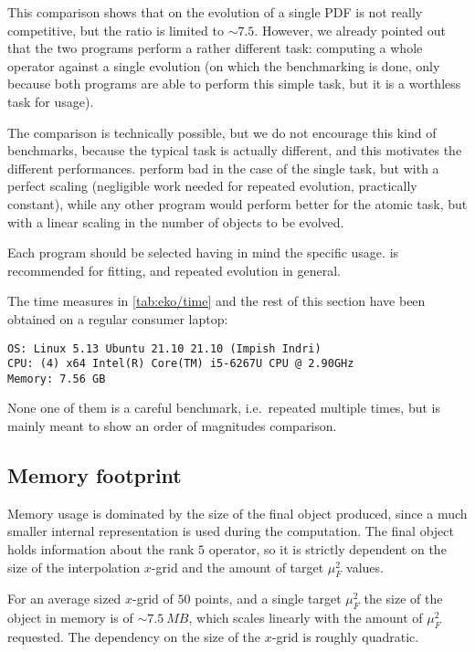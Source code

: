This comparison shows that on the evolution of a single PDF \eko{} is not
really competitive, but the ratio is limited to $\sim 7.5$. 
However, we already pointed out that the two programs perform a rather
different task: computing a whole operator against a single \pdf{} evolution
(on which the benchmarking is done, only because both programs are able to
perform this simple task, but it is a worthless task for \eko{} usage).

The comparison is technically possible, but we do not encourage this kind of
benchmarks, because the typical task is actually different, and this motivates
the different performances.
\eko{} perform bad in the case of the single task, but with a perfect scaling
(negligible work needed for repeated evolution, practically constant), while
any other program would perform better for the atomic task, but with a linear
scaling in the number of objects to be evolved.

Each program should be selected having in mind the specific usage. \eko{} is
recommended for \pdf{} fitting, and repeated evolution in general.

The time measures in \cref{tab:eko/time} and the rest of this
section have been obtained on a regular consumer laptop:
\begin{verbatim}
OS: Linux 5.13 Ubuntu 21.10 21.10 (Impish Indri)
CPU: (4) x64 Intel(R) Core(TM) i5-6267U CPU @ 2.90GHz
Memory: 7.56 GB
\end{verbatim}
None one of them is a careful benchmark, i.e.\ repeated multiple times, but is mainly
meant to show an order of magnitudes comparison.

\subsection{Memory footprint}
\label{app:code:memory}

Memory usage is dominated by the size of the final object produced,
since a much smaller internal representation is used during the computation.
The final object holds information about the rank $5$ operator, so it is
strictly dependent on the size of the interpolation $x$-grid and the amount of
target $\mu_F^2$ values.

For an average sized $x$-grid of $50$ points, and a single target $\mu_F^2$ the
size of the object in memory is of $\sim \SI{7.5}{MB}$, which scales linearly
with the amount of $\mu_F^2$ requested.
The dependency on the size of the $x$-grid is roughly quadratic.

